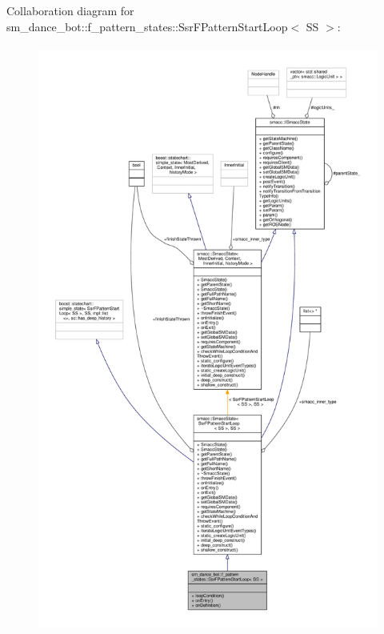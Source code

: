 Collaboration diagram for sm\+\_\+dance\+\_\+bot\+:\+:f\+\_\+pattern\+\_\+states\+:\+:Ssr\+F\+Pattern\+Start\+Loop$<$ SS $>$\+:\nopagebreak
\begin{figure}[H]
\begin{center}
\leavevmode
\includegraphics[height=550pt]{structsm__dance__bot_1_1f__pattern__states_1_1SsrFPatternStartLoop__coll__graph}
\end{center}
\end{figure}
